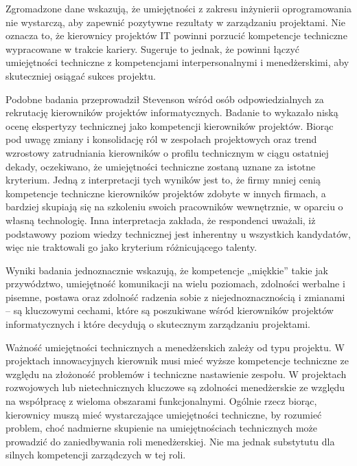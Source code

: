 Zgromadzone dane wskazują, że umiejętności z zakresu inżynierii oprogramowania nie wystarczą, aby zapewnić pozytywne rezultaty w zarządzaniu projektami. Nie oznacza to, że kierownicy projektów IT powinni porzucić kompetencje techniczne wypracowane w trakcie kariery. Sugeruje to jednak, że powinni łączyć umiejętności techniczne z kompetencjami interpersonalnymi i menedżerskimi, aby skuteczniej osiągać sukces projektu.\autocite{silva2015project}


Podobne badania przeprowadził Stevenson wśród osób odpowiedzialnych za rekrutację kierowników projektów informatycznych.\autocite{stevenson2010pm} Badanie to wykazało niską ocenę ekspertyzy technicznej jako kompetencji kierowników projektów. Biorąc pod uwagę zmiany i konsolidację ról w zespołach projektowych oraz trend wzrostowy zatrudniania kierowników o profilu technicznym w ciągu ostatniej dekady, oczekiwano, że umiejętności techniczne zostaną uznane za istotne kryterium. Jedną z interpretacji tych wyników jest to, że firmy mniej cenią kompetencje techniczne kierowników projektów zdobyte w innych firmach, a bardziej skupiają się na szkoleniu swoich pracowników wewnętrznie, w oparciu o własną technologię. Inna interpretacja zakłada, że respondenci uważali, iż podstawowy poziom wiedzy technicznej jest inherentny u wszystkich kandydatów, więc nie traktowali go jako kryterium różnicującego talenty.

Wyniki badania jednoznacznie wskazują, że kompetencje „miękkie” takie jak przywództwo, umiejętność komunikacji na wielu poziomach, zdolności werbalne i pisemne, postawa oraz zdolność radzenia sobie z niejednoznacznością i zmianami – są kluczowymi cechami, które są poszukiwane wśród kierowników projektów informatycznych i które decydują o skutecznym zarządzaniu projektami.\autocite{stevenson2010pm}

Ważność umiejętności technicznych a menedżerskich zależy od typu projektu. W projektach innowacyjnych kierownik musi mieć wyższe kompetencje techniczne ze względu na złożoność problemów i techniczne nastawienie zespołu. W projektach rozwojowych lub nietechnicznych kluczowe są zdolności menedżerskie ze względu na współpracę z wieloma obszarami funkcjonalnymi. Ogólnie rzecz biorąc, kierownicy muszą mieć wystarczające umiejętności techniczne, by rozumieć problem, choć nadmierne skupienie na umiejętnościach technicznych może prowadzić do zaniedbywania roli menedżerskiej. Nie ma jednak substytutu dla silnych kompetencji zarządczych w tej roli.

